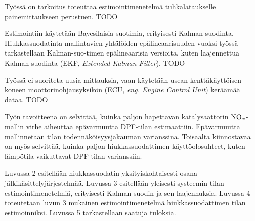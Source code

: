 Työssä on tarkoitus toteuttaa estimointimenetelmä tuhkalataukselle painemittaukseen perustuen.{\color{red} TODO}

Estimointiin käytetään Bayesilaisia suotimia, erityisesti Kalman-suodinta. Hiukkassuodatinta mallintavien yhtälöiden epälineaarisuuden vuoksi työssä tarkastellaan Kalman-suo-timen epälineaarisia versioita, kuten laajennettua Kalman-suodinta (EKF, \emph{Extended Kalman Filter}).{\color{red} TODO} 

Työssä ei suoriteta uusia mittauksia, vaan käytetään usean kenttäkäyttöisen koneen moottorinohjausyksikön (ECU, \emph{eng. Engine Control Unit}) keräämää dataa. {\color{red} TODO}

Työn tavoitteena on selvittää, kuinka paljon hapettavan katalysaattorin \(\ce{NO}_x\)-mallin virhe aiheuttaa epävarmuutta DPF-tilan estimaattiin. Epävarmuutta mallinnetaan tilan todennäköisyysjakauman varianssina. Toisaalta kiinnostavaa on myös selvittää, kuinka paljon hiukkassuodattimen käyttöolosuhteet, kuten lämpötila vaikuttavat DPF-tilan varianssiin. 

Luvussa 2 esitellään hiukkassuodatin yksityiskohtaisesti osana jälkikäsittelyjärjestelmää.
Luvussa 3 esitellään yleisesti systeemin tilan estimointimenetelmiä, erityisesti Kalman-suodin ja sen laajennuksia.
Luvussa 4 toteutetaan luvun 3 mukainen estimointimenetelmä hiukkassuodattimen tilan estimoinniksi. Luvussa 5 tarkastellaan saatuja tuloksia.